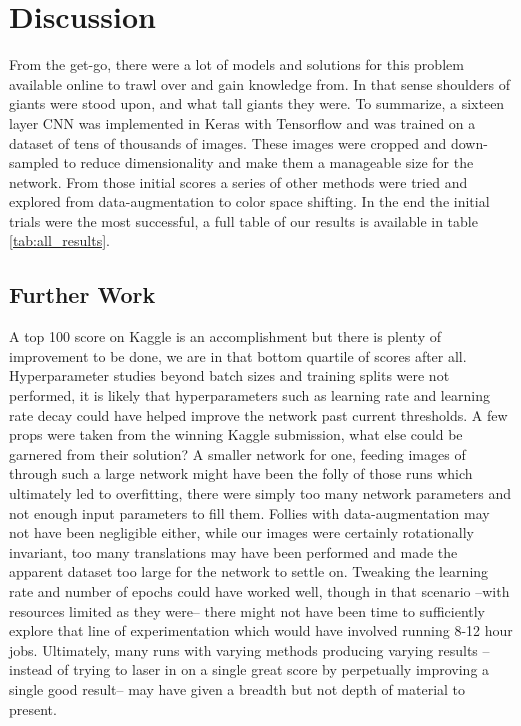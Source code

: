 \section{Discussion}

From the get-go, there were a lot of models and solutions for this problem available online to trawl over and gain knowledge from. In that sense shoulders of giants were stood upon, and what tall giants they were. To summarize, a sixteen layer CNN was implemented in Keras with Tensorflow and was trained on a dataset of tens of thousands of images. These images were cropped and down-sampled to reduce dimensionality and make them a manageable size for the network. From those initial scores a series of other methods were tried and explored from data-augmentation to color space shifting. In the end the initial trials were the most successful, a full table of our results is available in table \ref{tab:all_results}.

\subsection{Further Work}
A top 100 score on Kaggle is an accomplishment but there is plenty of improvement to be done, we are in that bottom quartile of scores after all. Hyperparameter studies beyond batch sizes and training splits were not performed, it is likely that hyperparameters such as learning rate and learning rate decay could have helped improve the network past current thresholds. A few props were taken from the winning Kaggle submission, what else could be garnered from their solution? A smaller network for one, feeding images of  through such a large network might have been the folly of those runs which ultimately led to overfitting, there were simply too many network parameters and not enough input parameters to fill them. Follies with data-augmentation may not have been negligible either, while our images were certainly rotationally invariant, too many translations may have been performed and made the apparent dataset too large for the network to settle on. Tweaking the learning rate and number of epochs could have worked well, though in that scenario --with resources limited as they were-- there might not have been time to sufficiently explore that line of experimentation which would have involved running 8-12 hour jobs. Ultimately, many runs with varying methods producing varying results --instead of trying to laser in on a single great score by perpetually improving a single good result-- may have given a breadth but not depth of material to present.

